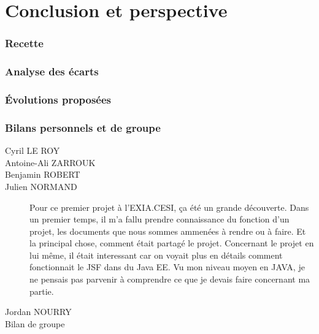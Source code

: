 \part{Conclusion et perspective}
\section{Recette}
\section{Analyse des écarts}
\section{Évolutions proposées}
\section{Bilans personnels et de groupe}

\begin{description}
	\item[Cyril LE ROY]
	\item[Antoine-Ali ZARROUK]
	\item[Benjamin ROBERT]
	\item[Julien NORMAND]
	Pour ce premier projet à l'EXIA.CESI, ça été un grande découverte. Dans un premier temps, il m'a fallu prendre connaissance du fonction d'un projet, les documents que nous sommes ammenées à rendre ou à faire. Et la principal chose, comment était partagé le projet.
	Concernant le projet en lui même, il était interessant car on voyait plus en détails comment fonctionnait le JSF dans du Java EE. Vu mon niveau moyen en JAVA, je ne pensais pas parvenir à comprendre ce que je devais faire concernant ma partie. 
	\item[Jordan NOURRY]
	\item[Bilan de groupe]
\end{description}
